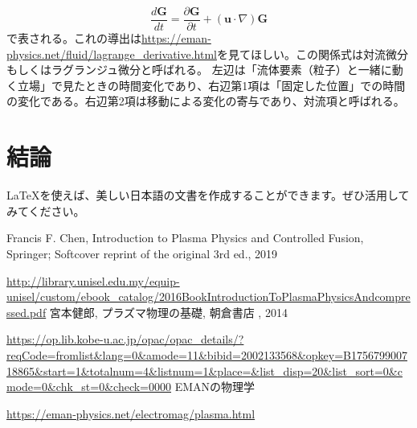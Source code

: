 \documentclass{ltjsarticle}
\numberwithin{equation}{section} %
\begin{document}
\begin{equation}
  \frac{d\bm{G}}{dt} = \frac{\partial \bm{G}}{\partial t} + (\bm{u}\cdot \nabla)\bm{G}
\end{equation}
で表される。これの導出は\url{https://eman-physics.net/fluid/lagrange_derivative.html}を見てほしい。この関係式は対流微分もしくはラグランジュ微分と呼ばれる。
左辺は「流体要素（粒子）と一緒に動く立場」で見たときの時間変化であり、右辺第1項は「固定した位置」での時間の変化である。右辺第2項は移動による変化の寄与であり、対流項と呼ばれる。













\section{結論}
LaTeXを使えば、美しい日本語の文書を作成することができます。ぜひ活用してみてください。




\begin{thebibliography}{99}
 Francis F. Chen, Introduction to Plasma Physics and Controlled Fusion, Springer; Softcover reprint of the original 3rd ed., 2019\par
\url{http://library.unisel.edu.my/equip-unisel/custom/ebook_catalog/2016BookIntroductionToPlasmaPhysicsAndcompressed.pdf}
 宮本健郎, プラズマ物理の基礎, 朝倉書店 , 2014\par
\url{https://op.lib.kobe-u.ac.jp/opac/opac_details/?reqCode=fromlist&lang=0&amode=11&bibid=2002133568&opkey=B175679900718865&start=1&totalnum=4&listnum=1&place=&list_disp=20&list_sort=0&cmode=0&chk_st=0&check=0000}
 EMANの物理学\par
\url{https://eman-physics.net/electromag/plasma.html}
\end{thebibliography}
\end{document}
